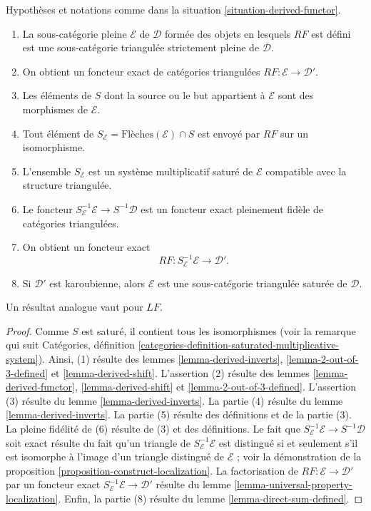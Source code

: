 \begin{proposition}
\label{proposition-derived-functor}
Hypothèses et notations comme dans la
situation \ref{situation-derived-functor}.
\begin{enumerate}
\item La sous-catégorie pleine $\mathcal{E}$ de $\mathcal{D}$ formée des
objets en lesquels $RF$ est défini est une sous-catégorie triangulée
strictement pleine de $\mathcal{D}$.
\item On obtient un foncteur exact de catégories triangulées
$RF : \mathcal{E} \longrightarrow \mathcal{D}'$.
\item Les éléments de $S$ dont la source ou le but appartient à $\mathcal{E}$
sont des morphismes de $\mathcal{E}$.
\item Tout élément de
$S_\mathcal{E} = \text{Flèches}(\mathcal{E}) \cap S$ est envoyé par $RF$ sur
un isomorphisme.
\item L'ensemble $S_\mathcal{E}$ est un système multiplicatif saturé de
$\mathcal{E}$ compatible avec la structure triangulée.
\item Le foncteur $S_\mathcal{E}^{-1}\mathcal{E} \to S^{-1}\mathcal{D}$ est un
foncteur exact pleinement fidèle de catégories triangulées.
\item On obtient un foncteur exact
$$
RF : S_\mathcal{E}^{-1}\mathcal{E} \longrightarrow \mathcal{D}'.
$$
\item Si $\mathcal{D}'$ est karoubienne, alors $\mathcal{E}$ est une
sous-catégorie triangulée saturée de $\mathcal{D}$.
\end{enumerate}
Un résultat analogue vaut pour $LF$.
\end{proposition}

\begin{proof}
Comme $S$ est saturé, il contient tous les isomorphismes (voir la remarque qui
suit Catégories, définition
\ref{categories-definition-saturated-multiplicative-system}). Ainsi, (1)
résulte des lemmes \ref{lemma-derived-inverts},
\ref{lemma-2-out-of-3-defined} et \ref{lemma-derived-shift}. L'assertion (2)
résulte des lemmes \ref{lemma-derived-functor}, \ref{lemma-derived-shift} et
\ref{lemma-2-out-of-3-defined}. L'assertion (3) résulte du
lemme \ref{lemma-derived-inverts}. La partie (4) résulte du
lemme \ref{lemma-derived-inverts}. La partie (5) résulte des définitions et de
la partie (3). La pleine fidélité de (6) résulte de (3) et des définitions. Le
fait que $S_\mathcal{E}^{-1}\mathcal{E} \to S^{-1}\mathcal{D}$ soit exact
résulte du fait qu'un triangle de $S_\mathcal{E}^{-1}\mathcal{E}$ est
distingué si et seulement s'il est isomorphe à l'image d'un triangle distingué
de $\mathcal{E}$ ; voir la démonstration de la
proposition \ref{proposition-construct-localization}. La factorisation de
$RF : \mathcal{E} \to \mathcal{D}'$ par un foncteur exact
$S_\mathcal{E}^{-1}\mathcal{E} \to \mathcal{D}'$ résulte du
lemme \ref{lemma-universal-property-localization}. Enfin, la partie (8) résulte
du lemme \ref{lemma-direct-sum-defined}.
\end{proof}

